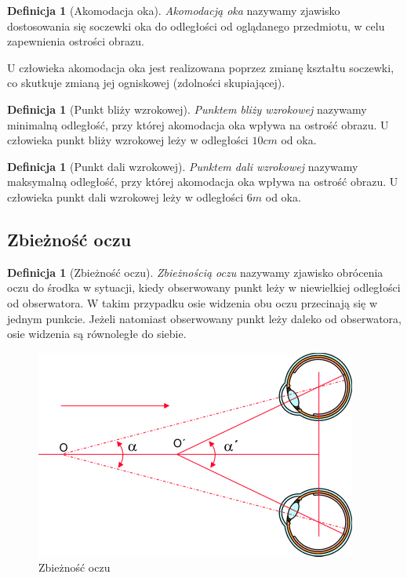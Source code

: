 \documentclass[a4paper,11pt,twoside]{report}
\theoremstyle{definition}
\newtheorem{definition}[theorem]{Definicja}
\begin{document}
\begin{definition}[Akomodacja oka]
\textit{Akomodacją oka} nazywamy zjawisko dostosowania się soczewki oka do odległości od oglądanego przedmiotu, w celu zapewnienia ostrości obrazu.
\end{definition}

U człowieka akomodacja oka jest realizowana poprzez zmianę kształtu soczewki, co skutkuje zmianą jej ogniskowej (zdolności skupiającej).

\begin{definition}[Punkt bliży wzrokowej]
\textit{Punktem bliży wzrokowej} nazywamy minimalną odległość, przy której akomodacja oka wpływa na ostrość obrazu. U człowieka punkt bliży wzrokowej leży w odległości $10 cm$ od oka.
\end{definition}

\begin{minipage}{\linewidth}
\begin{definition}[Punkt dali wzrokowej]
\textit{Punktem dali wzrokowej} nazywamy maksymalną odległość, przy której akomodacja oka wpływa na ostrość obrazu. U człowieka punkt dali wzrokowej leży w odległości $6 m$ od oka.
\end{definition}
\end{minipage}

\subsection {Zbieżność oczu}

\begin{definition}[Zbieżność oczu]
\textit{Zbieżnością oczu} nazywamy zjawisko obrócenia oczu do środka w sytuacji, kiedy obserwowany punkt leży w niewielkiej odległości od obserwatora. W takim przypadku osie widzenia obu oczu przecinają się w jednym punkcie. Jeżeli natomiast obserwowany punkt leży daleko od obserwatora, osie widzenia są równoległe do siebie.
\end{definition}

\begin{figure}[h]
\centering
\includegraphics[scale=0.5]{zbieznosc}
\caption[Zbieżność oczu (źródło: http://www.swiatlo.tak.pl/1/index.php/funkcje-wzroku-akomodacja-adaptacja-zbieznosc/)]{Zbieżność oczu}
\end{figure}
\end{document}
